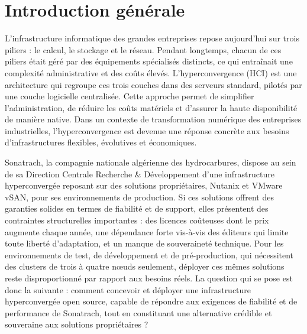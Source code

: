 
\chapter*{Introduction générale}

\par L'infrastructure informatique des grandes entreprises repose aujourd'hui sur trois piliers : le calcul, le stockage et le réseau. Pendant longtemps, chacun de ces piliers était géré par des équipements spécialisés distincts, ce qui entraînait une complexité administrative et des coûts élevés. L'hyperconvergence (HCI) est une architecture qui regroupe ces trois couches dans des serveurs standard, pilotés par une couche logicielle centralisée. Cette approche permet de simplifier l'administration, de réduire les coûts matériels et d'assurer la haute disponibilité de manière native. Dans un contexte de transformation numérique des entreprises industrielles, l'hyperconvergence est devenue une réponse concrète aux besoins d'infrastructures flexibles, évolutives et économiques.\\

\par Sonatrach, la compagnie nationale algérienne des hydrocarbures, dispose au sein de sa Direction Centrale Recherche \& Développement d'une infrastructure hyperconvergée reposant sur des solutions propriétaires, Nutanix et VMware vSAN, pour ses environnements de production. Si ces solutions offrent des garanties solides en termes de fiabilité et de support, elles présentent des contraintes structurelles importantes : des licences coûteuses dont le prix augmente chaque année, une dépendance forte vis-à-vis des éditeurs qui limite toute liberté d'adaptation, et un manque de souveraineté technique. Pour les environnements de test, de développement et de pré-production, qui nécessitent des clusters de trois à quatre n\oe{}uds seulement, déployer ces mêmes solutions reste disproportionné par rapport aux besoins réels. La question qui se pose est donc la suivante : comment concevoir et déployer une infrastructure hyperconvergée open source, capable de répondre aux exigences de fiabilité et de performance de Sonatrach, tout en constituant une alternative crédible et souveraine aux solutions propriétaires ?\\

